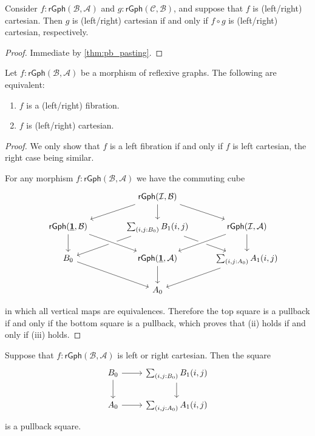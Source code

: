 \begin{lem}
Consider $f:\mathsf{rGph}(\mathcal{B},\mathcal{A})$ and $g:\mathsf{rGph}(\mathcal{C},\mathcal{B})$, and suppose that $f$ is (left/right) cartesian. Then $g$ is (left/right) cartesian if and only if $f\circ g$ is (left/right) cartesian, respectively.
\end{lem}

\begin{proof}
Immediate by \cref{thm:pb_pasting}.
\end{proof}

\begin{prp}\label{prp:fib_cart}
Let $f:\mathsf{rGph}(\mathcal{B},\mathcal{A})$ be a morphism of reflexive graphs. The following are equivalent:
\begin{enumerate}
\item $f$ is a (left/right) fibration.
\item $f$ is (left/right) cartesian.
\end{enumerate}
\end{prp}

\begin{proof}
We only show that $f$ is a left fibration if and only if $f$ is left cartesian, the right case being similar.

For any morphism $f:\mathsf{rGph}(\mathcal{B},\mathcal{A})$ we have the commuting cube
\begin{equation*}
\begin{tikzcd}
& \mathsf{rGph}(\mathcal{I},\mathcal{B}) \arrow[dl] \arrow[d] \arrow[dr] \\
\mathsf{rGph}(\unit,\mathcal{B}) \arrow[d] & \sm{i,j:\pts{B}}\edg{B}(i,j) \arrow[dl] \arrow[dr] & \mathsf{rGph}(\mathcal{I},\mathcal{A}) \arrow[dl,crossing over] \arrow[d] \\
\pts{B} \arrow[dr] & \mathsf{rGph}(\unit,\mathcal{A}) \arrow[d] \arrow[from=ul,crossing over] & \sm{i,j:\pts{A}}\edg{A}(i,j) \arrow[dl] \\
\phantom{\sm{i,j:\pts{A}}\edg{A}(i,j)} & \pts{A}
\end{tikzcd}
\end{equation*}
in which all vertical maps are equivalences. Therefore the top square is a pullback if and only if the bottom square is a pullback, which proves that (ii) holds if and only if (iii) holds.
\end{proof}

\begin{cor}
Suppose that $f:\mathsf{rGph}(\mathcal{B},\mathcal{A})$ is left or right cartesian. Then the square
\begin{equation*}
\begin{tikzcd}
\pts{B} \arrow[r] \arrow[d] & \sm{i,j:\pts{B}}\edg{B}(i,j) \arrow[d] \\
\pts{A} \arrow[r] & \sm{i,j:\pts{A}}\edg{A}(i,j)
\end{tikzcd}
\end{equation*}
is a pullback square.
\end{cor}

